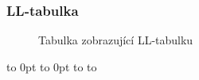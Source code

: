\documentclass[a4paper, 12pt]{article} %
\def\fillandplacepagenumber{%
        \par\pagestyle{empty}%
        \vbox to 0pt{\vss}\vfill
        \vbox to 0pt{\baselineskip0pt
            \hbox to\linewidth{\hss}%
            \baselineskip\footskip
            \hbox to\linewidth{%
                \hfil\thepage\hfil}\vss}} %
\begin{document}
            \newpage
            \begin{landscape}
                \subsubsection*{LL-tabulka}\label{lltabulka}
                \thispagestyle{empty}
                \begin{figure}[htbp]
                    \centering
                    \caption{Tabulka zobrazující LL-tabulku}
                \end{figure}
                \fillandplacepagenumber
            \end{landscape}
            \newpage

\end{document}
